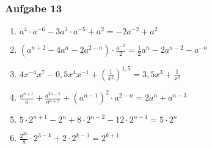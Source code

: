 \subsubsection{Aufgabe 13}
\begin{enumerate}
	\item \quad $ a^4 \cdot a^{-6} - 3a^3 \cdot a^{-5} + a^2 =-2a^{-2} + a^2 $										%
	\item \quad $ (a^{n+2} - 4a^n - 2a^{2-n})\cdot \frac{a^{-2}}{2} =\frac{1}{2}a^n - 2a^{n-2} -a^{-n} $	%
	\item \quad $ 4x^{-4}x^7 - 0,5 x^4x^{-1} + \left(\frac{1}{x^2}\right)^{1,5} =3,5x^3 + \frac{1}{x^3} $						%
	\item \quad $ \frac{a^{n+1}}{a} + \frac{a^{2n-1}}{a^{n+2}} + (a^{n-1})^2 \cdot a^{2-n} =2a^n + a^{n-3} $										%
	\item \quad $ 5 \cdot 2^{n+1} - 2^n + 8 \cdot 2^{n-2} - 12 \cdot 2^{n-1}=5\cdot 2^n $												%
	\item \quad $ \frac{2^{2k}}{8} \cdot 2^{3-k} + 2 \cdot 2^{k-1} =2^{k+1} $														%
\end{enumerate}
